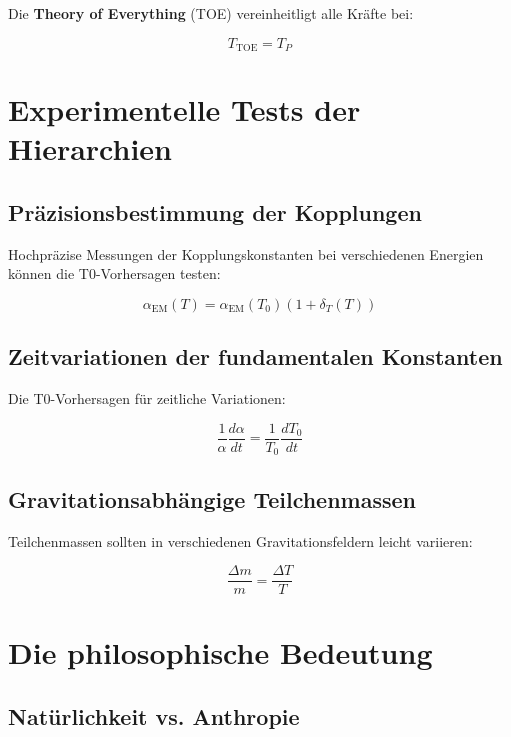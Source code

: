 \documentclass[12pt,a4paper]{report}
\begin{document}
	Die \textbf{Theory of Everything} (TOE) vereinheitligt alle Kräfte bei:
	
	\begin{equation}
		T_{\text{TOE}} = T_P
	\end{equation}
	
	\section{Experimentelle Tests der Hierarchien}
	
	\subsection{Präzisionsbestimmung der Kopplungen}
	
	Hochpräzise Messungen der Kopplungskonstanten bei verschiedenen Energien können die T0-Vorhersagen testen:
	
	\begin{equation}
		\alpha_{\text{EM}}(T) = \alpha_{\text{EM}}(T_0)\left(1 + \delta_T(T)\right)
	\end{equation}
	
	\subsection{Zeitvariationen der fundamentalen Konstanten}
	
	Die T0-Vorhersagen für zeitliche Variationen:
	
	\begin{equation}
		\frac{1}{\alpha}\frac{d\alpha}{dt} = \frac{1}{T_0}\frac{dT_0}{dt}
	\end{equation}
	
	\subsection{Gravitationsabhängige Teilchenmassen}
	
	Teilchenmassen sollten in verschiedenen Gravitationsfeldern leicht variieren:
	
	\begin{equation}
		\frac{\Delta m}{m} = \frac{\Delta T}{T}
	\end{equation}
	
	\section{Die philosophische Bedeutung}
	
	\subsection{Natürlichkeit vs. Anthropie}
	
\end{document}
